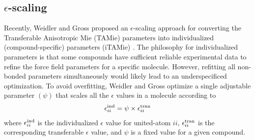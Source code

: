 \documentclass[journal=jced,manuscript=article]{achemso}
\begin{document}


\subsection{$\epsilon$-scaling} \label{sec: eps scaling methods}

Recently, Weidler and Gross proposed an $\epsilon$-scaling approach for converting the Transferable Anisotropic Mie (TAMie)\cite{TAMie} parameters into individualized (compound-specific) parameters (iTAMie) \cite{Weidler2018}. The philosophy for individualized parameters is that some compounds have sufficient reliable experimental data to refine the force field parameters for a specific molecule. However, refitting all non-bonded parameters simultaneously would likely lead to an underspecificed optimization. To avoid overfitting, Weidler and Gross optimize a single adjustable parameter $(\psi)$ that scales all the $\epsilon$ values in a molecule according to
\begin{equation}
\epsilon_{ii}^{\rm ind} = \psi \times \epsilon_{ii}^{\rm tran}
\end{equation}
where $\epsilon_{ii}^{\rm ind}$ is the individualized $\epsilon$ value for united-atom $ii$, $\epsilon_{ii}^{\rm tran}$ is the corresponding transferable $\epsilon$ value, and $\psi$ is a fixed value for a given compound.



\end{document}
